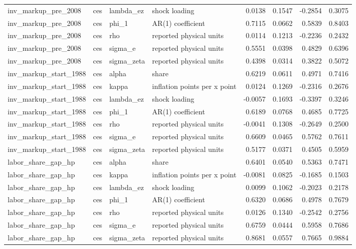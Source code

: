 \begin{tabular}{llllrrrr}
inv\_markup\_pre\_2008 & ces & lambda\_ez & shock loading & 0.0138 & 0.1547 & -0.2854 & 0.3075 \\
inv\_markup\_pre\_2008 & ces & phi\_1 & AR(1) coefficient & 0.7115 & 0.0662 & 0.5839 & 0.8403 \\
inv\_markup\_pre\_2008 & ces & rho & reported physical units & 0.0114 & 0.1213 & -0.2236 & 0.2432 \\
inv\_markup\_pre\_2008 & ces & sigma\_e & reported physical units & 0.5551 & 0.0398 & 0.4829 & 0.6396 \\
inv\_markup\_pre\_2008 & ces & sigma\_zeta & reported physical units & 0.4398 & 0.0314 & 0.3822 & 0.5072 \\
inv\_markup\_start\_1988 & ces & alpha & share & 0.6219 & 0.0611 & 0.4971 & 0.7416 \\
inv\_markup\_start\_1988 & ces & kappa & inflation points per x point & 0.0124 & 0.1269 & -0.2316 & 0.2676 \\
inv\_markup\_start\_1988 & ces & lambda\_ez & shock loading & -0.0057 & 0.1693 & -0.3397 & 0.3246 \\
inv\_markup\_start\_1988 & ces & phi\_1 & AR(1) coefficient & 0.6189 & 0.0768 & 0.4685 & 0.7725 \\
inv\_markup\_start\_1988 & ces & rho & reported physical units & -0.0041 & 0.1308 & -0.2649 & 0.2500 \\
inv\_markup\_start\_1988 & ces & sigma\_e & reported physical units & 0.6609 & 0.0465 & 0.5762 & 0.7611 \\
inv\_markup\_start\_1988 & ces & sigma\_zeta & reported physical units & 0.5177 & 0.0371 & 0.4505 & 0.5959 \\
labor\_share\_gap\_hp & ces & alpha & share & 0.6401 & 0.0540 & 0.5363 & 0.7471 \\
labor\_share\_gap\_hp & ces & kappa & inflation points per x point & -0.0081 & 0.0825 & -0.1685 & 0.1503 \\
labor\_share\_gap\_hp & ces & lambda\_ez & shock loading & 0.0099 & 0.1062 & -0.2023 & 0.2178 \\
labor\_share\_gap\_hp & ces & phi\_1 & AR(1) coefficient & 0.6320 & 0.0686 & 0.4978 & 0.7679 \\
labor\_share\_gap\_hp & ces & rho & reported physical units & 0.0126 & 0.1340 & -0.2542 & 0.2756 \\
labor\_share\_gap\_hp & ces & sigma\_e & reported physical units & 0.6759 & 0.0444 & 0.5958 & 0.7686 \\
labor\_share\_gap\_hp & ces & sigma\_zeta & reported physical units & 0.8681 & 0.0557 & 0.7665 & 0.9884 \\

\end{tabular}
